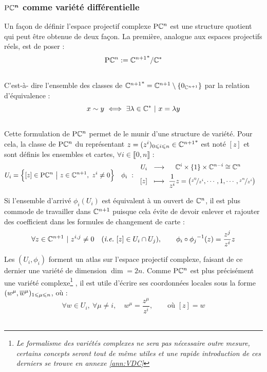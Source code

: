 \subsubsection{$\boldsymbol{\text{\normalfont P}\mathbb{C}^{n}}$ comme variété différentielle}\label{subsec:PC^n_variet}



Un façon de définir l'espace projectif complexe $\text{\normalfont P}\mathbb{C}^{n}$ est une structure quotient qui peut être obtenue de deux façon. La première, analogue aux espaces projectifs réels, est de poser :
\[\text{\normalfont P}\mathbb{C}^{n} := {\mathbb{C}^{n+1}}^*/\mathbb{C}^*\]
\\
C'est-à- dire l'ensemble des classes de ${\mathbb{C}^{n+1}}^* = \mathbb{C}^{n+1} \setminus \{0_{\mathbb{C}^{n+1}}\}$ par la relation d'équivalence :
\[x \sim y\ \Llr\ \exists \lambda\in\C^*\ |\ x=\lambda y\]
\\
Cette formulation de $\text{\normalfont P}\mathbb{C}^{n}$ permet de le munir d'une structure de variété. Pour cela, la classe de $\text{\normalfont P}\mathbb{C}^{n}$ du représentant $z = (z^i)_{0\leqslant i\leqslant n}\in{\mathbb{C}^{n+1}}^*$ est noté $[z]$ et sont définis les ensembles et cartes, $\forall i\in\llbracket0,n\rrbracket$ :
\begin{align}
	U_i &= \Big\{[z]\in\text{\normalfont P}\mathbb{C}^{n}\ \big|\ z\in \mathbb{C}^{n+1},\ z^i\neq 0\Big\}  &  \phi_i\  :\quad &\begin{aligned}
		U_i\ \ &\longrightarrow\quad\ \mathbb{C}^{i}\times \{1\} \times\mathbb{C}^{n-i}\cong \mathbb{C}^{n} \\ [z]\ \ &\longmapsto\ \frac{1}{z^i}z = \big(\nicefrac{z^0}{z^i},\cdots, 1, \cdots, \nicefrac{z^n}{z^i}\big)
	\end{aligned}
\end{align}
\begin{remarque}
	Si l'ensemble d'arrivé $\phi_i(U_i)$ est équivalent à un ouvert de $\mathbb{C}^{n}$, il est plus commode de travailler dans $\mathbb{C}^{n+1}$ puisque cela évite de devoir enlever et rajouter des coefficient dans les formules de changement de carte :
	\[ \forall z\in\C^{n+1}\ |\ z^{i,j}\neq 0\quad (\ie~[z]\in U_i\cap U_j) ,\qquad \phi_i \circ {\phi_j}^{-1}(z) = \frac{z^j}{z^i}z\]
\end{remarque}
\skipl
Les $(U_i,\phi_i)$ forment un atlas sur l'espace projectif complexe, faisant de ce dernier une variété de dimension $\dim = 2n$. Comme $\text{\normalfont P}\mathbb{C}^{n}$ est plus précisément une variété complexe\footnote{\itshape
	Le formalisme des variétés complexes ne sera pas nécessaire outre mesure, certains concepts seront tout de même utiles et une rapide introduction de ces derniers se trouve en annexe \ref{ann:VDC}}
, il est utile d'écrire ses coordonnées locales sous la forme $(w^\mu, \overline{w}^\mu)_{1\leqslant \mu \leqslant n}$, où :
\[\forall w\in U_i,\ \forall \mu\neq i,\quad w^\mu = \frac{z^\mu}{z^i},\qquad  \text{où } [z] = w\]
\\


